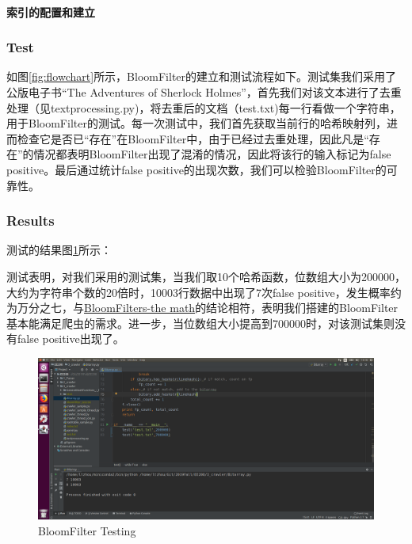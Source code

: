 \documentclass{article}
\begin{document}
\paragraph{索引的配置和建立}








\subsubsection{Test}
如图\ref{fig:flowchart}所示，BloomFilter的建立和测试流程如下。测试集我们采用了公版电子书“The Adventures of Sherlock Holmes”，首先我们对该文本进行了去重处理（见textprocessing.py)，将去重后的文档（test.txt)每一行看做一个字符串，用于BloomFilter的测试。每一次测试中，我们首先获取当前行的哈希映射列，进而检查它是否已“存在”在BloomFilter中，由于已经过去重处理，因此凡是“存在”的情况都表明BloomFilter出现了混淆的情况，因此将该行的输入标记为false positive。最后通过统计false positive的出现次数，我们可以检验BloomFilter的可靠性。



\subsubsection{Results}
测试的结果图\ref{img:1}所示：


测试表明，对我们采用的测试集，当我们取10个哈希函数，位数组大小为200000，大约为字符串个数的20倍时，10003行数据中出现了7次false positive，发生概率约为万分之七，与\href{http://pages.cs.wisc.edu/~cao/papers/summary-cache/node8.html}{BloomFilters-the math}的结论相符，表明我们搭建的BloomFilter基本能满足爬虫的需求。进一步，当位数组大小提高到700000时，对该测试集则没有false positive出现了。

\begin{figure}[htbp]
\centering
\includegraphics[width=13.5cm]{img/test1.png}
\caption{BloomFilter Testing}
\label{img:1}
\end{figure}
\end{document}
